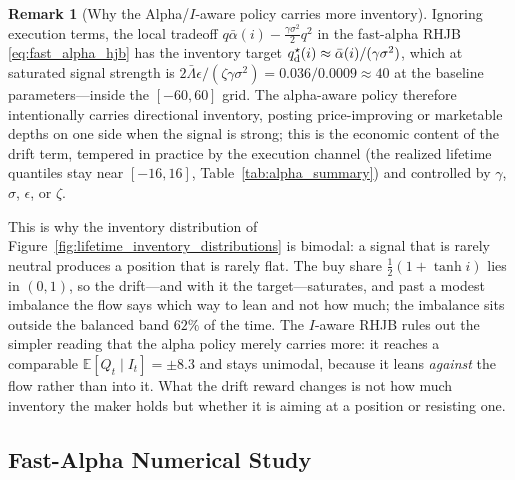 \documentclass[11pt,a4paper]{article}
\newcommand{\E}{\mathbb{E}}
\newcommand{\alphabar}{\bar\alpha}
\theoremstyle{plain}
\theoremstyle{definition}
\newtheorem{remark}{Remark}[section]
\begin{document}
\begin{remark}[Why the Alpha/\(I\)-aware policy carries more inventory]
\label{rem:why_carry_inventory}
Ignoring execution terms, the local tradeoff
\(q\alphabar(i)-\tfrac{\gamma\sigma^2}{2}q^2\) in the fast-alpha RHJB \eqref{eq:fast_alpha_hjb} has the
inventory target \(q^\star_{\rm d}(i)\approx\alphabar(i)/(\gamma\sigma^2)\),
which at saturated signal strength is
\(2\bar\Lambda\epsilon/(\zeta\gamma\sigma^2)=0.036/0.0009\approx40\) at the
baseline parameters---inside the \([-60,60]\) grid.  The alpha-aware policy
therefore intentionally carries directional inventory, posting
price-improving or marketable depths on one side when the signal is strong;
this is the economic content of the drift term, tempered in practice by the
execution channel (the realized lifetime quantiles stay near \([-16,16]\),
Table~\ref{tab:alpha_summary}) and controlled by \(\gamma\), \(\sigma\),
\(\epsilon\), or \(\zeta\).

This is why the inventory distribution of
Figure~\ref{fig:lifetime_inventory_distributions} is bimodal: a signal that is
rarely neutral produces a position that is rarely flat.  The buy share
\(\tfrac12(1+\tanh i)\) lies in \((0,1)\), so the drift---and with it the
target---saturates, and past a modest imbalance the flow says which way to lean
and not how much; the imbalance sits outside the balanced band \(62\%\) of the
time.  The \(I\)-aware RHJB rules out the simpler reading that the alpha policy
merely carries more: it reaches a comparable \(\E[Q_t\mid I_t]=\pm8.3\) and
stays unimodal, because it leans \emph{against} the flow rather than into it.
What the drift reward changes is not how much inventory the maker holds but
whether it is aiming at a position or resisting one.
\end{remark}

\subsection{Fast-Alpha Numerical Study}
\end{document}
